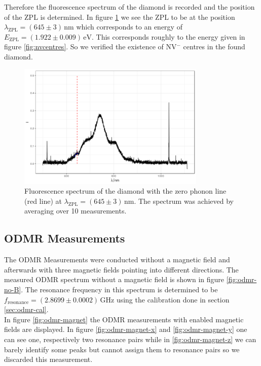Therefore the fluorescence spectrum of the diamond is recorded and the position of the ZPL is determined. In figure \ref{fig:fluorescence} we see the ZPL to be at the position $\lambda_\text{ZPL}=(645\pm3)\,\mathrm{nm}$ which corresponds to an energy of $E_\text{ZPL}=(1.922\pm0.009)\,\mathrm{eV}$. This corresponds roughly to the energy given in figure \ref{fig:nvcentres}. So we verified the existence of NV$^-$ centres in the found diamond.
\begin{figure}
	\centering
	\includegraphics[width=0.8\textwidth]{../figures/fluorescence.png}
	\caption[Fluorescence spectrum of the diamond]{Fluorescence spectrum of the diamond with the zero phonon line (red line) at $\lambda_\text{ZPL}=(645\pm3)\,\mathrm{nm}$. The spectrum was achieved by averaging over 10 measurements.}
	\label{fig:fluorescence}
\end{figure}

\subsection{ODMR Measurements}

The ODMR Measurements were conducted without a magnetic field and afterwards with three magnetic fields pointing into different directions. The measured ODMR spectrum without a magnetic field is shown in figure \ref{fig:odmr-no-B}. The resonance frequency in this spectrum is determined to be $f_\text{resonance}=(2.8699\pm0.0002)\,\mathrm{GHz}$ using the calibration done in section \ref{sec:odmr-cal}.\\

In figure \ref{fig:odmr-magnet} the ODMR measurements with enabled magnetic fields are displayed. In figure \ref{fig:odmr-magnet-x} and \ref{fig:odmr-magnet-y} one can see one, respectively two resonance pairs while in \ref{fig:odmr-magnet-z} we can barely identify some peaks but cannot assign them to resonance pairs so we discarded this measurement.\\

